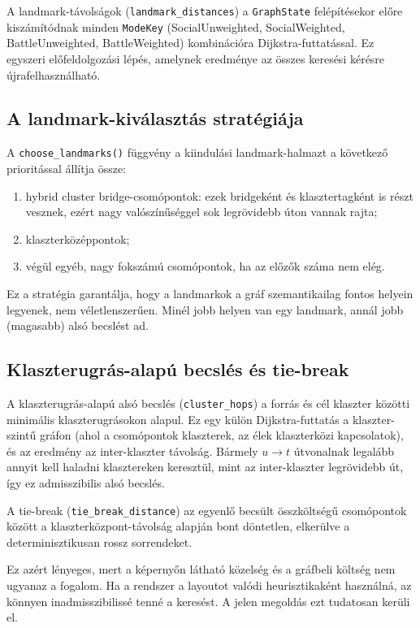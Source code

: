﻿\documentclass[a4paper,12pt]{report}
\begin{document}
A landmark-távolságok (\texttt{landmark\_distances}) a \texttt{GraphState} felépítésekor előre kiszámítódnak minden \texttt{ModeKey} (SocialUnweighted, SocialWeighted, BattleUnweighted, BattleWeighted) kombinációra Dijkstra-futtatással. Ez egyszeri előfeldolgozási lépés, amelynek eredménye az összes keresési kérésre újrafelhasználható.

\subsection{A landmark-kiválasztás stratégiája}

A \texttt{choose\_landmarks()} függvény a kiindulási landmark-halmazt a következő prioritással állítja össze:

\begin{enumerate}
    \item hybrid cluster bridge-csomópontok: ezek bridgeként és klasztertagként is részt vesznek, ezért nagy valószínűséggel sok legrövidebb úton vannak rajta;
    \item klaszterközéppontok;
    \item végül egyéb, nagy fokszámú csomópontok, ha az előzők száma nem elég.
\end{enumerate}

Ez a stratégia garantálja, hogy a landmarkok a gráf szemantikailag fontos helyein legyenek, nem véletlenszerűen. Minél jobb helyen van egy landmark, annál jobb (magasabb) alsó becslést ad.

\subsection{Klaszterugrás-alapú becslés és tie-break}

A klaszterugrás-alapú alsó becslés (\texttt{cluster\_hops}) a forrás és cél klaszter közötti minimális klaszterugrásokon alapul. Ez egy külön Dijkstra-futtatás a klaszter-szintű gráfon (ahol a csomópontok klaszterek, az élek klaszterközi kapcsolatok), és az eredmény az inter-klaszter távolság. Bármely $u \to t$ útvonalnak legalább annyit kell haladni klasztereken keresztül, mint az inter-klaszter legrövidebb út, így ez admisszibilis alsó becslés.

A tie-break (\texttt{tie\_break\_distance}) az egyenlő becsült összköltségű csomópontok között a klaszterközpont-távolság alapján bont döntetlen, elkerülve a determinisztikusan rossz sorrendeket.

Ez azért lényeges, mert a képernyőn látható közelség és a gráfbeli költség nem ugyanaz a fogalom. Ha a rendszer a layoutot valódi heurisztikaként használná, az könnyen inadmisszibilissé tenné a keresést. A jelen megoldás ezt tudatosan kerüli el.
\end{document}
